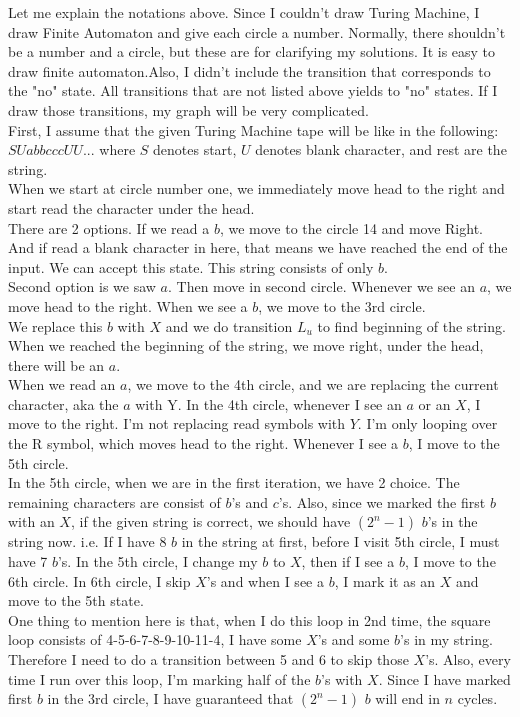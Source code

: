 \documentclass[12pt]{article}
\begin{document}
Let me explain the notations above. Since I couldn't draw Turing Machine, I draw Finite Automaton and give each circle a number. Normally, there shouldn't be a number and a circle, but these are for clarifying my solutions. It is easy to draw finite automaton.Also, I didn't include the transition that corresponds to the "no" state. All transitions that are not listed above yields to "no" states. If I draw those transitions, my graph will be very complicated.\\
First, I assume that the given Turing Machine tape will be like in the following: $SUabbcccUU...$ where $S$ denotes start, $U$ denotes blank character, and rest are the string. \\
When we start at circle number one, we immediately move head to the right and start read the character under the head.\\
There are 2 options. If we read a $b$, we move to the circle 14 and move Right. And if read a blank character in here, that means we have reached the end of the input. We can accept this state. This string consists of only $b$.\\
Second option is we saw $a$. Then move in second circle. Whenever we see an $a$, we move head to the right. When we see a $b$, we move to the 3rd circle.\\
We replace this $b$ with $X$ and we do transition $L_u$ to find beginning of the string. When we reached the beginning of the string, we move right, under the head, there will be an $a$.\\
When we read an $a$, we move to the 4th circle, and we are replacing the current character, aka the $a$ with Y. In the 4th circle, whenever I see an $a$ or an $X$, I move to the right. I'm not replacing read symbols with $Y$. I'm only looping over the R symbol, which moves head to the right. Whenever I see a $b$, I move to the 5th circle.\\
In the 5th circle, when we are in the first iteration, we have 2 choice. The remaining characters are consist of $b$'s and $c$'s. Also, since we marked the first $b$ with an $X$, if the given string is correct, we should have $(2^n - 1)$ $b$'s in the string now. i.e. If I have 8 $b$ in the string at first, before I visit 5th circle, I must have 7 $b$'s. In the 5th circle, I change my $b$ to $X$, then if I see a $b$, I move to the 6th circle. In 6th circle, I skip $X$'s and when I see a $b$, I mark it as an $X$ and move to the 5th state.\\
One thing to mention here is that, when I do this loop in 2nd time, the square loop consists of 4-5-6-7-8-9-10-11-4, I have some $X$'s and some $b$'s in my string. Therefore I need to do a transition between 5 and 6 to skip those $X$'s. Also, every time I run over this loop, I'm marking half of the $b$'s with $X$. Since I have marked first $b$ in the 3rd circle, I have guaranteed that $(2^n -1)$ $b$ will end in $n$ cycles.\\
\end{document}
